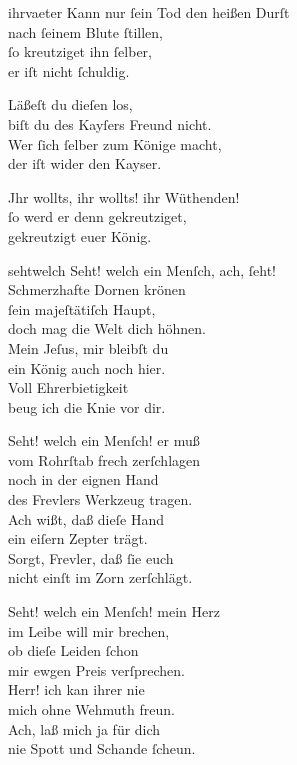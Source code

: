\documentclass[abbrwidth=6em,tocstyle=ref-genre,toe=false]{ees}
\begin{document}
{\begin{movement}{ihrvaeter}
  \voice[Pilatus]
  Kann nur ſein Tod den heißen Durſt\\
  nach ſeinem Blute ſtillen,\\
  ſo kreutziget ihn ſelber,\\
  er iſt nicht ſchuldig.

  Läßeſt du dieſen los,\\
  biſt du des Kayſers Freund nicht.\\
  Wer ſich ſelber zum Könige macht,\\
  der iſt wider den Kayser.

  \voice[Pilatus]
  Jhr wollts, ihr wollts! ihr Wüthenden!\\
  ſo werd er denn gekreutziget,\\
  gekreutzigt euer König.
\end{movement}

\begin{movement}{sehtwelch}
  \voice[Chor]
  Seht! welch ein Menſch, ach, ſeht!\\
  Schmerzhafte Dornen krönen\\
  ſein majeſtätiſch Haupt,\\
  doch mag die Welt dich höhnen.\\
  Mein Jeſus, mir bleibſt du\\
  ein König auch noch hier.\\
  Voll Ehrerbietigkeit\\
  beug ich die Knie vor dir.

  Seht! welch ein Menſch! er muß\\
  vom Rohrſtab frech zerſchlagen\\
  noch in der eignen Hand\\
  des Frevlers Werkzeug tragen.\\
  Ach wißt, daß dieſe Hand\\
  ein eiſern Zepter trägt.\\
  Sorgt, Frevler, daß ſie euch\\
  nicht einſt im Zorn zerſchlägt.

  Seht! welch ein Menſch! mein Herz\\
  im Leibe will mir brechen,\\
  ob dieſe Leiden ſchon\\
  mir ewgen Preis verſprechen.\\
  Herr! ich kan ihrer nie\\
  mich ohne Wehmuth freun.\\
  Ach, laß mich ja für dich\\
  nie Spott und Schande ſcheun.
\end{movement}

}
\end{document}
